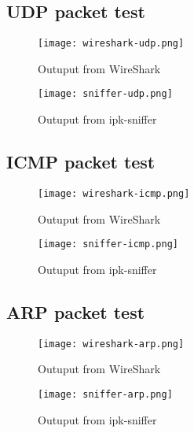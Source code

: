 \documentclass{article}
\begin{document}
\subsection{UDP packet test}
\begin{figure}
    \centering
    \texttt{[image: wireshark-udp.png]}
    \caption{Outuput from WireShark}
\end{figure}
\begin{figure}
    \centering
    \texttt{[image: sniffer-udp.png]}
    \caption{Outuput from ipk-sniffer}
\end{figure}

\newpage

\subsection{ICMP packet test}
\begin{figure}[ht]
    \centering
    \texttt{[image: wireshark-icmp.png]}
    \caption{Outuput from WireShark}
\end{figure}
\begin{figure}[ht]
    \centering
    \texttt{[image: sniffer-icmp.png]}
    \caption{Outuput from ipk-sniffer}
\end{figure}

\newpage

\subsection{ARP packet test}
\begin{figure}[h]
    \centering
    \texttt{[image: wireshark-arp.png]}
    \caption{Outuput from WireShark}
\end{figure}
\begin{figure}[h]
    \centering
    \texttt{[image: sniffer-arp.png]}
    \caption{Outuput from ipk-sniffer}
\end{figure}

\newpage
\end{document}
